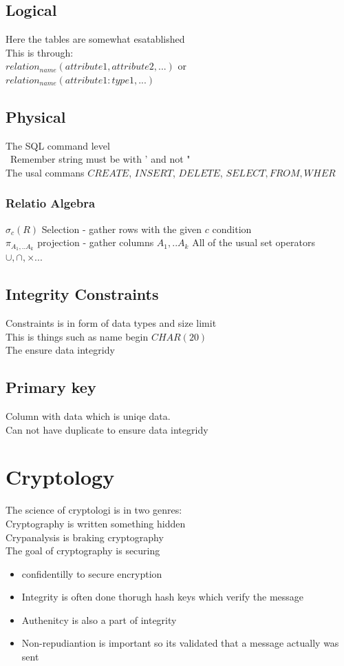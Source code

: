 \documentclass[12pt, a4paper]{article}
\begin{document}
			\subsection{Logical}
				Here the tables are somewhat esatablished\\
				This is through:\\
				$relation_{name}(attribute1,attribute2,...)$ or\\
				$relation_{name}(attribute1: type1,...)$\\
			\subsection{Physical}
				The SQL command level\\\
				Remember string must be with ' and not "\\
				The usal commans $CREATE$, $INSERT$, $DELETE$, $SELECT, FROM, WHER$
				\subsubsection{Relatio Algebra}
					$\sigma_c(R)$ Selection - gather rows with the given $c$ condition\\
					$\pi_{A_1,..A_k}$ projection - gather columns $A_1,..A_k$
					All of the usual set operators $\cup,\cap,\times ...$
			\subsection{Integrity Constraints}
				Constraints is in form of data types and size limit\\
				This is things such as name begin $CHAR(20)$\\
				The ensure data integridy
			\subsection{Primary key}
				Column with data which is uniqe data.\\
				Can not have duplicate to ensure data integridy
		\section{Cryptology}
			The science of cryptologi is in two genres:\\
			Cryptography is written something hidden\\
			Crypanalysis is braking cryptography\\
			The goal of cryptography is securing 
			\begin{itemize}
				\item confidentilly to secure encryption
				\item Integrity is often done thorugh hash keys which verify the message
				\item Authenitcy is also a part of integrity
				\item Non-repudiantion is important so its validated that a message actually was sent
			\end{itemize}
\end{document}
